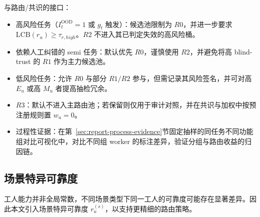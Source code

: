 与路由/共识的接口：
\begin{itemize}
    \item 高风险任务（$I_t^{\mathrm{OOD}}=1$ 或 $g_t$ 触发）：候选池限制为 $R0$，并进一步要求 $\mathrm{LCB}(r_u)\ge\tau_{r,high}$。$R2$ 不进入其已判定失效的高风险桶。
    \item 依赖人工纠错的 semi 任务：默认优先 $R0$，谨慎使用 $R2$，并避免将高 blind-trust 的 $R1$ 作为主力候选池。
    \item 低风险任务：允许 $R0$ 与部分 $R1/R2$ 参与，但需记录其风险签名，并可对高 $E_u$ 或高 $M_u$ 者提高抽检冗余。
    \item $R3$：默认不进入主路由池；若保留则仅用于审计对照，并在共识与加权中按预注册规则置 $w_u=0$。
    \item 过程性证据：在第~\ref{sec:report-process-evidence}节固定抽样的同任务不同功能组对比可视化中，对比不同组 worker 的标注差异，验证分组与路由收益的归因链。
\end{itemize}
\subsection{场景特异可靠度}\label{sec:method-scene-reliability}

工人能力并非全局常数，不同场景类型下同一工人的可靠度可能存在显著差异。因此本文引入场景特异可靠度 $r_u^{\left(s\right)}$，以支持更精细的路由策略。


